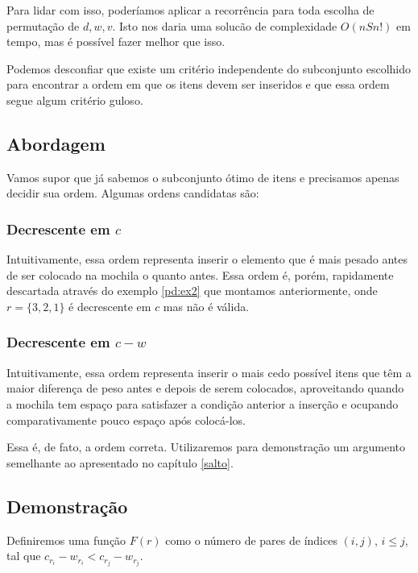Para lidar com isso, poderíamos aplicar a recorrência \label{pd:recnaiv} para toda escolha de permutação de $d, w, v$. Isto nos daria uma solucão de complexidade $O(nSn!)$ em tempo, mas é possível fazer melhor que isso.

Podemos desconfiar que existe um critério independente do subconjunto escolhido para encontrar a ordem em que os itens devem ser inseridos e que essa ordem segue algum critério guloso.

\subsection*{Abordagem}

Vamos supor que já sabemos o subconjunto ótimo de itens e precisamos apenas decidir sua ordem. Algumas ordens candidatas são:

\subsubsection*{Decrescente em $c$}

Intuitivamente, essa ordem representa inserir o elemento que é mais pesado antes de ser colocado na mochila o quanto antes. Essa ordem é, porém, rapidamente descartada através do exemplo \ref{pd:ex2} que montamos anteriormente, onde $r = \{3, 2, 1\}$ é decrescente em $c$ mas não é válida.

\subsubsection*{Decrescente em $c - w$}

Intuitivamente, essa ordem representa inserir o mais cedo possível itens que têm a maior diferença de peso antes e depois de serem colocados, aproveitando quando a mochila tem espaço para satisfazer a condição anterior a inserção e ocupando comparativamente pouco espaço após colocá-los.

Essa é, de fato, a ordem correta. Utilizaremos para demonstração um argumento semelhante ao apresentado no capítulo \ref{salto}.

\subsection*{Demonstração}

Definiremos uma função $F(r)$ como o número de pares de índices $(i, j)$, $i \leq j$, tal que $c_{r_i} - w_{r_i} < c_{r_j} - w_{r_j}$.

